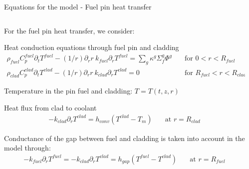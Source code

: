 \begin{frame}{Equations for the model - Fuel pin heat transfer}

  \tiny

  \begin{columns}
  \begin{column}{8cm}

    For the fuel pin heat transfer, we consider:

    \begin{block}{Heat conduction equations through fuel pin and cladding}
      \begin{align}
        \rho_{fuel} C_{p}^{fuel} \partial_{t} T^{fuel} 
        - (1/r) \partial_{r} r\ k_{fuel} \partial_{r} T^{fuel} 
        = \sum_{g} \kappa^{g} \Sigma_{f}^{g} \Phi^{g}
        \quad &\mbox{for } 0 < r < R_{fuel} \nonumber \\
        \rho_{clad} C_{p}^{clad} \partial_{t} T^{clad} 
        - (1/r) \partial_{r} r\ k_{clad} \partial_{r} T^{clad} 
        = 0 \quad &\mbox{for } R_{fuel} < r < R_{clad} \nonumber
      \end{align}
    \end{block}

    Temperature in the pin fuel and cladding: $ T = T(t,z,r) $ 


    \begin{block}{Heat flux from clad to coolant}
      \begin{align}
        -k_{clad} \partial_r T^{clad} = 
        h_{conv} \left( T^{clad} - T_{m} \right)
        \quad &\mbox{at } r = R_{clad} \nonumber
      \end{align}
    \end{block}

      Conductance of the gap between fuel and cladding is taken into account in the model through:
      \begin{align}
        -k_{fuel} \partial_{r} T^{fuel} =
        -k_{clad} \partial_{r} T^{clad} = 
        h_{gap} \left( T^{fuel} - T^{clad} \right)
        \quad &\mbox{at } r = R_{fuel} \nonumber 
      \end{align}

  \end{column}

  \begin{column}{4cm}


\end{column}
\end{columns}
\end{frame}
